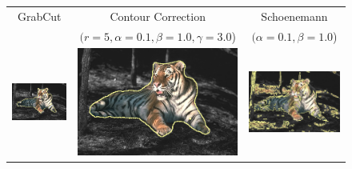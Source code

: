 \documentclass[runningheads]{llncs}
\begin{document}
\begin{figure}
	\center
	\begin{tabular}{ccc}
		GrabCut & Contour Correction & Schoenemann \\
		& $(r=5, \alpha=0.1, \beta=1.0, \gamma=3.0$) & $(\alpha=0.1, \beta=1.0$)\\
		\includegraphics[scale=0.2]{images/segmentation/bc/tiger1/gc-seg.png} &
		\includegraphics[scale=0.2]{images/segmentation/bc/tiger1/corrected-seg.png} &					\includegraphics[scale=0.2]{images/segmentation/schoenemann/tiger1/tiger1-seg.png}\\									

\end{tabular}
\end{figure}
\end{document}
